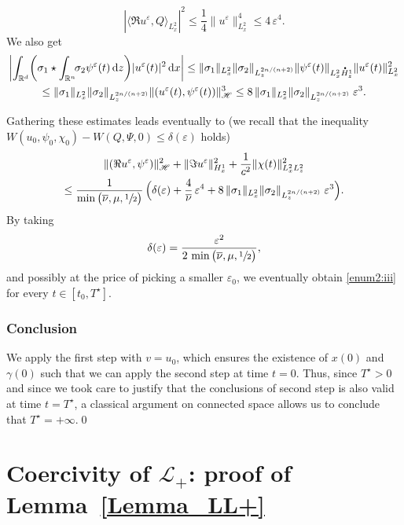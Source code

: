 \documentclass[10pt]{amsart}
\let\bar\oldbar
\theoremstyle{definition}
\newcommand*{\overbigdot}[1]{%
\accentset{\mbox{\large\bfseries .}}{#1}}
\let\bar\overline
\newcommand{\R}{\mathbb{R}}
\newcommand{\ud}{\, {\mathrm{d}}}
\begin{document}
\[
\left|\langle \Re u^{\varepsilon},Q\rangle_{L_{x}^{2}}\right|^{2}\leq\frac{1}{4}\|u^{\varepsilon}\|_{L_{x}^{2}}^{4}\leq 4\,\varepsilon^{4}.
\]
We also get
\bgroup
{}
\begin{multline*}
\left|\int_{\R^{d}}\biggl(\sigma_{1}\star\int_{\R^{n}}\!\!\sigma_{2}\psi^{\varepsilon}(t)\ud z\biggr)|u^{\varepsilon}(t)|^{2}\ud x\right|\leq\|\sigma_{1}\|_{L_{x}^{2}}\|\sigma_{2}\|_{L_{z}^{2n/(n+2)}}\|\psi^{\varepsilon}(t)\|_{L_{x}^{2}\overbigdot{H}_{z}^{1}}\|u^{\varepsilon}(t)\|_{L_{x}^{2}}^{2}\\
\leq\|\sigma_{1}\|_{L_{x}^{2}}\|\sigma_{2}\|_{L_{z}^{2n/(n+2)}}\|(u^{\varepsilon}(t),\psi^{\varepsilon}(t))\|_{\mathscr{H}}^{3}\leq 8\,\|\sigma_{1}\|_{L_{x}^{2}}\|\sigma_{2}\|_{L_{z}^{2n/(n+2)}}\;\varepsilon^{3}.
\end{multline*}
\egroup

Gathering these estimates leads eventually to (we recall that the inequality $W(u_{0},\psi_{0},\chi_{0})-W(Q,\Psi,0)\leq\delta(\varepsilon)$ holds)
\begin{multline*}
\|(\Re u^{\varepsilon},\psi^{\varepsilon})\|_{\mathscr{H}}^{2}+\|\Im u^{\varepsilon}\|_{H_{x}^{1}}^{2}+\frac{1}{c^{2}}\|\chi(t)\|_{L_{x}^{2}L_{z}^{2}}^{2}\\
\leq\frac{1}{\min\big(\bar{\nu},\mu,\sfrac{1}{2}\big)}\,\Bigl(\delta(\varepsilon)+\frac{4}{\bar{\nu}}\,\varepsilon^{4}+8\,\|\sigma_{1}\|_{L_{x}^{2}}\|\sigma_{2}\|_{L_{z}^{2n/(n+2)}}\;\varepsilon^{3}\Bigr).
\end{multline*}
By taking
\[
\delta(\varepsilon)=\frac{\varepsilon^{2}}{2\,\min\big(\bar{\nu},\mu,\sfrac{1}{2}\big)},
\]
and possibly at the price of picking a smaller $\varepsilon_{0}$, we eventually obtain \eqref{enum2:iii} for every $t\in[t_{0},T^{\star}]$.

\subsubsection*{Conclusion} We apply the first step with $v=u_{0}$, which ensures the existence of $x(0)$ and $\gamma(0)$ such that we can apply the second step at time $t=0$. Thus, since $T^{\star}>0$ and since we took care to justify that the conclusions of second step is also valid at time $t=T^{\star}$, a classical argument on connected space allows us to conclude that $T^{\star}=+\infty$.\qed

\section{Coercivity of \texorpdfstring{$\mathcal{L}_{+}$}{L}: proof of Lemma~\ref{Lemma_LL+}}\label{Proof_Lemma_LL+}
\end{document}
